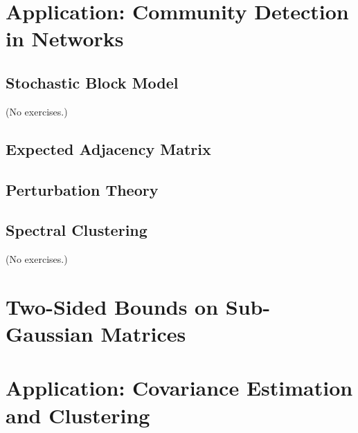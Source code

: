 \documentclass{report}
\theoremstyle{definition}
\newenvironment{exercise}[1]{
  \renewcommand\theexerciseimpl{#1}
  \exerciseimpl
}{\endexerciseimpl}
\begin{document}
\begin{exercise}{4.4.7}
\end{exercise}

\section{Application: Community Detection in Networks}

\subsection{Stochastic Block Model}

(No exercises.)

\subsection{Expected Adjacency Matrix}

\begin{exercise}{4.5.2}
\end{exercise}

\subsection{Perturbation Theory}

\begin{exercise}{4.5.4}
\end{exercise}

\subsection{Spectral Clustering}

(No exercises.)

\section{Two-Sided Bounds on Sub-Gaussian Matrices}

\begin{exercise}{4.6.2}
\end{exercise}

\begin{exercise}{4.6.3}
\end{exercise}

\begin{exercise}{4.6.4}
\end{exercise}

\section{Application: Covariance Estimation and Clustering}
\end{document}
